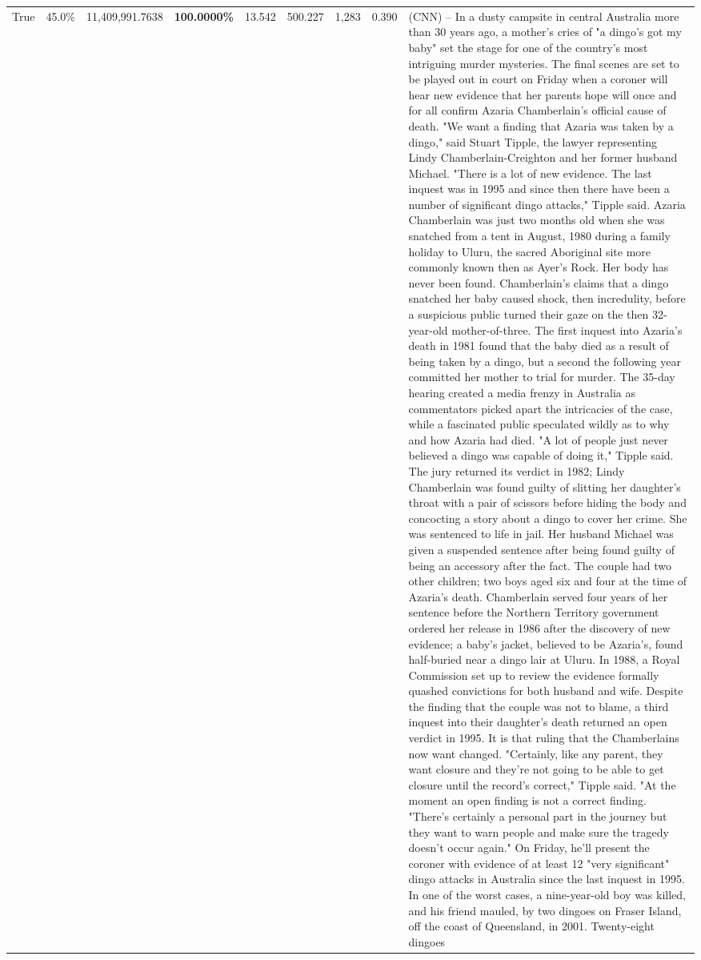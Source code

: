 \begin{table}[H]
\begin{tabular}{lllrlllll}
True & 45.0\% & 11,409,991.7638 & \bfseries \color{red} 100.0000\% & 13.542 & 500.227 & 1,283 & 0.390 & (CNN) -- In a dusty campsite in central Australia more than 30 years ago, a mother's cries of "a dingo's got my baby" set the stage for one of the country's most intriguing murder mysteries. The final scenes are set to be played out in court on Friday when a coroner will hear new evidence that her parents hope will once and for all confirm Azaria Chamberlain's official cause of death. "We want a finding that Azaria was taken by a dingo," said Stuart Tipple, the lawyer representing Lindy Chamberlain-Creighton and her former husband Michael. "There is a lot of new evidence. The last inquest was in 1995 and since then there have been a number of significant dingo attacks," Tipple said. Azaria Chamberlain was just two months old when she was snatched from a tent in August, 1980 during a family holiday to Uluru, the sacred Aboriginal site more commonly known then as Ayer's Rock. Her body has never been found. Chamberlain's claims that a dingo snatched her baby caused shock, then incredulity, before a suspicious public turned their gaze on the then 32-year-old mother-of-three. The first inquest into Azaria's death in 1981 found that the baby died as a result of being taken by a dingo, but a second the following year committed her mother to trial for murder. The 35-day hearing created a media frenzy in Australia as commentators picked apart the intricacies of the case, while a fascinated public speculated wildly as to why and how Azaria had died. "A lot of people just never believed a dingo was capable of doing it," Tipple said. The jury returned its verdict in 1982; Lindy Chamberlain was found guilty of slitting her daughter's throat with a pair of scissors before hiding the body and concocting a story about a dingo to cover her crime. She was sentenced to life in jail. Her husband Michael was given a suspended sentence after being found guilty of being an accessory after the fact. The couple had two other children; two boys aged six and four at the time of Azaria's death. Chamberlain served four years of her sentence before the Northern Territory government ordered her release in 1986 after the discovery of new evidence; a baby's jacket, believed to be Azaria's, found half-buried near a dingo lair at Uluru. In 1988, a Royal Commission set up to review the evidence formally quashed convictions for both husband and wife. Despite the finding that the couple was not to blame, a third inquest into their daughter's death returned an open verdict in 1995. It is that ruling that the Chamberlains now want changed. "Certainly, like any parent, they want closure and they're not going to be able to get closure until the record's correct," Tipple said. "At the moment an open finding is not a correct finding. "There's certainly a personal part in the journey but they want to warn people and make sure the tragedy doesn't occur again." On Friday, he'll present the coroner with evidence of at least 12 "very significant" dingo attacks in Australia since the last inquest in 1995. In one of the worst cases, a nine-year-old boy was killed, and his friend mauled, by two dingoes on Fraser Island, off the coast of Queensland, in 2001. Twenty-eight dingoes 
\end{tabular}
\end{table}
